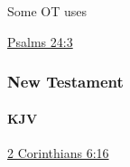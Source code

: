 				\begin{compactdesc}
					\item[Some OT uses] \textbf{}
						\begin{compactdesc}
							\item[{\hyperref[PSALMS-24-3]{Psalms 24:3}}]
						\end{compactdesc}
				\end{compactdesc}
			
		
		
	\subsubsection{New Testament} %
		\label{TEMPLE-NT}
	
		\paragraph{KJV}
			\label{TEMPLE-NT-KJV}		
	
			
			\begin{compactdesc}
				\item[{\hyperref[2CORINTHIANS-6-16]{2 Corinthians 6:16}}]
			\end{compactdesc}
			
		
			
